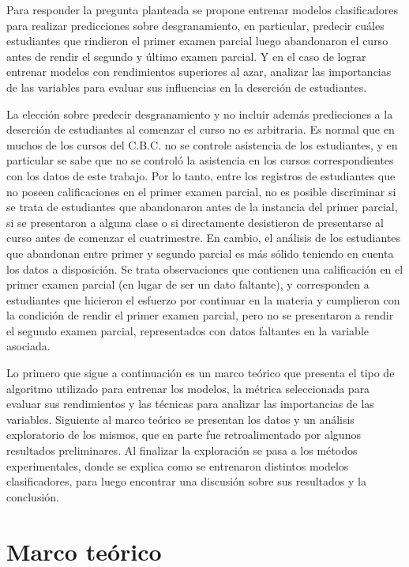 \documentclass[a4paper,11pt,dvipsnames]{article}
\begin{document}
Para responder la pregunta planteada se propone entrenar modelos clasificadores para realizar predicciones sobre desgranamiento, en particular, predecir cuáles estudiantes que rindieron el primer examen parcial luego abandonaron el curso antes de rendir el segundo y último examen parcial. Y en el caso de lograr entrenar modelos con rendimientos superiores al azar, analizar las importancias de las variables para evaluar sus influencias en la deserción de estudiantes.\par\medskip

La elección sobre predecir desgranamiento y no incluir además predicciones a la deserción de estudiantes al comenzar el curso no es arbitraria. Es normal que en muchos de los cursos del C.B.C. no se controle asistencia de los estudiantes, y en particular se sabe que no se controló la asistencia en los cursos correspondientes con los datos de este trabajo. Por lo tanto, entre los registros de estudiantes que no poseen calificaciones en el primer examen parcial, no es posible discriminar si se trata de estudiantes que abandonaron antes de la instancia del primer parcial, si se presentaron a alguna clase o si directamente desistieron de presentarse al curso antes de comenzar el cuatrimestre. En cambio, el análisis de los estudiantes que abandonan entre primer y segundo parcial es más sólido teniendo en cuenta los datos a disposición. Se trata observaciones que contienen una calificación en el primer examen parcial (en lugar de ser un dato faltante), y corresponden a estudiantes que hicieron el esfuerzo por continuar en la materia y cumplieron con la condición de rendir el primer examen parcial, pero no se presentaron a rendir el segundo examen parcial, representados con datos faltantes en la variable asociada.\par\medskip

Lo primero que sigue a continuación es un marco teórico que presenta el tipo de algoritmo utilizado para entrenar los modelos, la métrica seleccionada para evaluar sus rendimientos y las técnicas para analizar las importancias de las variables. Siguiente al marco teórico se presentan los datos y un análisis exploratorio de los mismos, que en parte fue retroalimentado por algunos resultados preliminares. Al finalizar la exploración se pasa a los métodos experimentales, donde se explica como se entrenaron distintos modelos clasificadores, para luego encontrar una discusión sobre sus resultados y la conclusión.

\section{Marco teórico}
\end{document}
